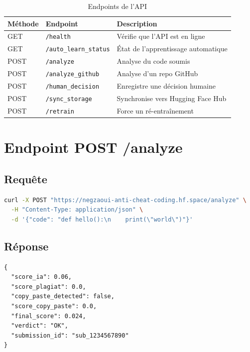 \documentclass[12pt,a4paper]{report}
\begin{document}
\begin{table}[H]
\centering
\renewcommand{\arraystretch}{1.4}
\begin{tabular}{l l p{7cm}}
\toprule
\textbf{Méthode} & \textbf{Endpoint} & \textbf{Description} \\
\midrule
GET & \texttt{/health} & Vérifie que l'API est en ligne \\
GET & \texttt{/auto\_learn\_status} & État de l'apprentissage automatique \\
POST & \texttt{/analyze} & Analyse du code soumis \\
POST & \texttt{/analyze\_github} & Analyse d'un repo GitHub \\
POST & \texttt{/human\_decision} & Enregistre une décision humaine \\
POST & \texttt{/sync\_storage} & Synchronise vers Hugging Face Hub \\
POST & \texttt{/retrain} & Force un ré-entraînement \\
\bottomrule
\end{tabular}
\caption{Endpoints de l'API}
\end{table}

\section{Endpoint POST /analyze}

\subsection{Requête}

\begin{lstlisting}[language=bash, caption=Exemple d'appel à /analyze]
curl -X POST "https://negzaoui-anti-cheat-coding.hf.space/analyze" \
  -H "Content-Type: application/json" \
  -d '{"code": "def hello():\n    print(\"world\")"}'
\end{lstlisting}

\subsection{Réponse}

\begin{lstlisting}[caption=Réponse de /analyze]
{
  "score_ia": 0.06,
  "score_plagiat": 0.0,
  "copy_paste_detected": false,
  "score_copy_paste": 0.0,
  "final_score": 0.024,
  "verdict": "OK",
  "submission_id": "sub_1234567890"
}
\end{lstlisting}
\end{document}
